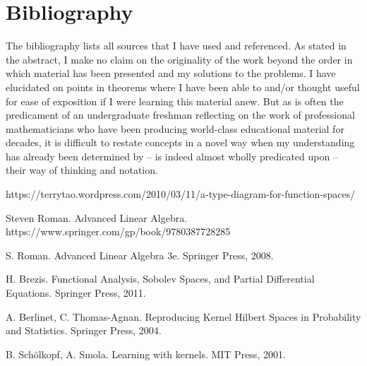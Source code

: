 \documentclass{article}
\theoremstyle{definition}
\theoremstyle{remark}
\numberwithin{equation}{section}
\begin{document}
\section{Bibliography}  
The bibliography lists all sources that I have used and referenced. As stated in the abstract, I make no claim on the originality of the work beyond the order in which material has been presented and my solutions to the problems. I have elucidated on points in theorems where I have been able to and/or thought useful for ease of exposition if I were learning this material anew. But as is often the predicament of an undergraduate freshman reflecting on the work of professional mathematicians who have been producing world-class educational material for decades, it is difficult to restate concepts in a novel way when my understanding has already been determined by -- is indeed almost wholly predicated upon -- their way of thinking and notation.

\pagebreak
\begin{thebibliography}{9}

 https://terrytao.wordpress.com/2010/03/11/a-type-diagram-for-function-spaces/

Steven Roman.
Advanced Linear Algebra.
https://www.springer.com/gp/book/9780387728285

S. Roman. 
Advanced Linear Algebra 3e. 
Springer Press, 2008.

H. Brezis.
Functional Analysis, Sobolev Spaces, and Partial Differential Equations.
Springer Press, 2011. 

A. Berlinet, C. Thomas-Agnan. 
Reproducing Kernel Hilbert Spaces in Probability and Statistics. 
Springer Press, 2004. 

B. Sch\"{o}lkopf, A. Smola. 
Learning with kernels. 
MIT Press, 2001. 

\end{thebibliography}
\end{document}
